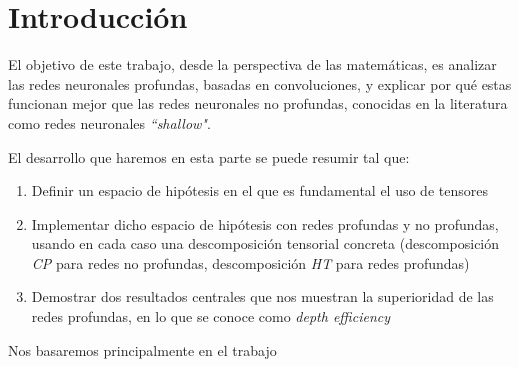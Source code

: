 
\chapter{Introducción}\label{ch:primer-capitulo}

El objetivo de este trabajo, desde la perspectiva de las matemáticas, es analizar las redes neuronales profundas, basadas en convoluciones, y explicar por qué estas funcionan mejor que las redes neuronales no profundas, conocidas en la literatura como redes neuronales \textit{``shallow"}.

El desarrollo que haremos en esta parte se puede resumir tal que:

\begin{enumerate}
    \item Definir un espacio de hipótesis en el que es fundamental el uso de tensores
    \item Implementar dicho espacio de hipótesis con redes profundas y no profundas, usando en cada caso una descomposición tensorial concreta (descomposición \textit{CP} para redes no profundas, descomposición \textit{HT} para redes profundas)
    \item Demostrar dos resultados centrales que nos muestran la superioridad de las redes profundas, en lo que se conoce como \textit{depth efficiency}
\end{enumerate}

Nos basaremos principalmente en el trabajo \cite{matematicas:principal}


\endinput
